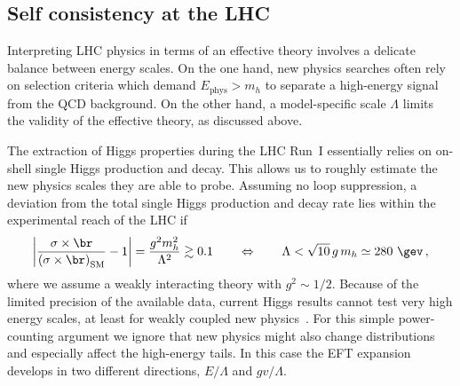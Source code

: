 \subsection*{Self consistency at the LHC}
\label{sec:validity_theory_self}

Interpreting LHC physics in terms of an effective theory involves a
delicate balance between energy scales.  On the one hand, new physics
searches often rely on selection criteria which demand
$E_{\text{phys}} > m_h$ to separate a high-energy signal from the QCD
background.  On the other hand, a model-specific scale $\Lambda$
limits the validity of the effective theory, as discussed above.

The extraction of Higgs properties during the LHC Run~I essentially
relies on on-shell single Higgs production and decay.  This allows us
to roughly estimate the new physics scales they are able to probe.
Assuming no loop suppression, a deviation from the total single Higgs
production and decay rate lies within the experimental reach of the
LHC if
%
\begin{align} \left| \frac{\sigma \times \br}{\left( \sigma \times \br
\right)_\text{SM}} - 1 \right| = \frac{g^2 m_h^2}{\Lambda^2} \gtrsim
0.1 \qquad \Leftrightarrow \qquad \Lambda < \sqrt{10} \, g \, m_h
\simeq 280~\gev \,,
\label{eq:lmax}
\end{align}
%
where we assume a weakly interacting theory with $g^2 \sim 1/2$.
Because of the limited precision of the available data, current Higgs
results cannot test very high energy scales, at least for weakly
coupled new physics~\cite{Corbett:2015ksa}.  For this simple
power-counting argument we ignore that new physics might also change
distributions and especially affect the high-energy tails. In this
case the EFT expansion develops in two different directions,
$E/\Lambda$ and $gv/\Lambda$.

